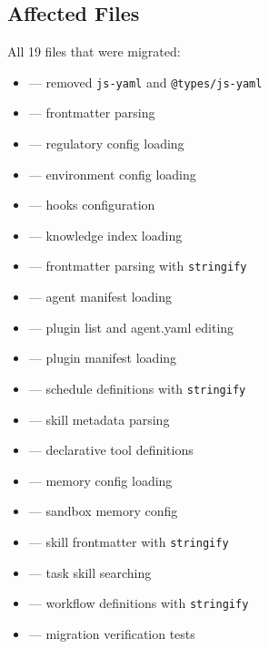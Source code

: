 \subsection*{Affected Files}
All 19 files that were migrated:
\begin{itemize}
    \item {} --- removed \texttt{js-yaml} and \texttt{@types/js-yaml}
    \item {} --- frontmatter parsing
    \item {} --- regulatory config loading
    \item {} --- environment config loading
    \item {} --- hooks configuration
    \item {} --- knowledge index loading
    \item {} --- frontmatter parsing with \texttt{stringify}
    \item {} --- agent manifest loading
    \item {} --- plugin list and agent.yaml editing
    \item {} --- plugin manifest loading
    \item {} --- schedule definitions with \texttt{stringify}
    \item {} --- skill metadata parsing
    \item {} --- declarative tool definitions
    \item {} --- memory config loading
    \item {} --- sandbox memory config
    \item {} --- skill frontmatter with \texttt{stringify}
    \item {} --- task skill searching
    \item {} --- workflow definitions with \texttt{stringify}
    \item {} --- migration verification tests
\end{itemize}

